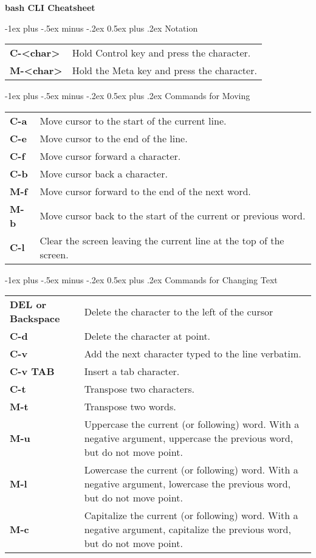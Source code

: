 \documentclass[10pt,landscape]{article}
\makeatletter
\renewcommand{\section}{\@startsection{section}{1}{0mm}%
	{-1ex plus -.5ex minus -.2ex}%
	{0.5ex plus .2ex}%
	{\normalfont\large\bfseries}}
\newcommand{\commandfmt}[1]{\ttfamily\bfseries #1}
\newcommand{\command}[2]{\commandfmt{#1} & #2 \\}
\newenvironment{commands}
{\settowidth{\MyLen}{\commandfmt{Backspace..}}
	\begin{tabular}{@{}p{\the\MyLen}%
			@{}p{\linewidth-\the\MyLen}@{}}}{\end{tabular}}
\newlength{\MyLen}
\makeatother
\begin{document}
	
\raggedright
\footnotesize 
	\begin{multicols*}{3}
		
		
		\setlength{\premulticols}{1pt}
		\setlength{\postmulticols}{1pt}
		\setlength{\multicolsep}{1pt}
		\setlength{\columnsep}{2pt}
		
		\begin{center}
			\Large{\textbf{bash CLI Cheatsheet}} \\
		\end{center}
		
\section{Notation}
\begin{commands}
  \command{C-<char>}{Hold Control key and press the character.}
  \command{M-<char>}{Hold the Meta key and press the character.}
\end{commands}
	
\section{Commands for Moving}
\begin{commands}
  \command{C-a}{Move cursor to the start of the current line.}
  \command{C-e}{Move cursor to the end of the line.}
  \command{C-f}{Move cursor forward a character.}
  \command{C-b}{Move cursor back a character.}
  \command{M-f}{Move cursor forward to the end of the next word.}
  \command{M-b}{Move cursor back to the start of the current or previous word.}
  \command{C-l}{Clear the screen leaving the current line at the top of the screen.}
\end{commands}

\section{Commands for Changing Text}
\begin{commands}
  \command{DEL or Backspace}{Delete the character to the left of the cursor}
  \command{C-d}{Delete the character at point.}
  \command{C-v}{Add the next character typed to the line verbatim.}
  \command{C-v TAB}{Insert a tab character.}
  \command{C-t}{Transpose two characters.}
  \command{M-t}{Transpose two words.}
  \command{M-u}{Uppercase the current (or following) word.  With a negative argument, uppercase the previous word, but do not move point.}
  \command{M-l}{Lowercase the current (or following) word.  With a negative argument, lowercase the previous word, but do not move point.}
  \command{M-c}{Capitalize the current (or following) word.  With a negative argument, capitalize the previous word, but do not move point.}
\end{commands}


\end{multicols*}
\end{document}
